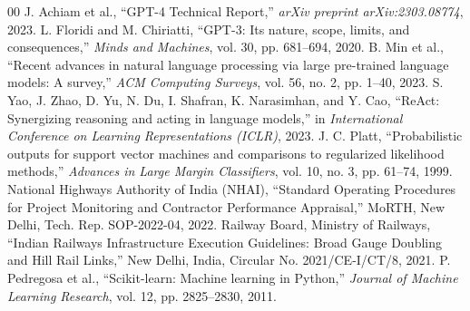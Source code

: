 \documentclass[conference]{IEEEtran}
\begin{document}
\begin{thebibliography}{00}
 J. Achiam et al., ``GPT-4 Technical Report,'' \textit{arXiv preprint arXiv:2303.08774}, 2023.
 L. Floridi and M. Chiriatti, ``GPT-3: Its nature, scope, limits, and consequences,'' \textit{Minds and Machines}, vol. 30, pp. 681--694, 2020.
 B. Min et al., ``Recent advances in natural language processing via large pre-trained language models: A survey,'' \textit{ACM Computing Surveys}, vol. 56, no. 2, pp. 1--40, 2023.
 S. Yao, J. Zhao, D. Yu, N. Du, I. Shafran, K. Narasimhan, and Y. Cao, ``ReAct: Synergizing reasoning and acting in language models,'' in \textit{International Conference on Learning Representations (ICLR)}, 2023.
 J. C. Platt, ``Probabilistic outputs for support vector machines and comparisons to regularized likelihood methods,'' \textit{Advances in Large Margin Classifiers}, vol. 10, no. 3, pp. 61--74, 1999.
 National Highways Authority of India (NHAI), ``Standard Operating Procedures for Project Monitoring and Contractor Performance Appraisal,'' MoRTH, New Delhi, Tech. Rep. SOP-2022-04, 2022.
 Railway Board, Ministry of Railways, ``Indian Railways Infrastructure Execution Guidelines: Broad Gauge Doubling and Hill Rail Links,'' New Delhi, India, Circular No. 2021/CE-I/CT/8, 2021.
 P. Pedregosa et al., ``Scikit-learn: Machine learning in Python,'' \textit{Journal of Machine Learning Research}, vol. 12, pp. 2825--2830, 2011.
\end{thebibliography}
\end{document}
